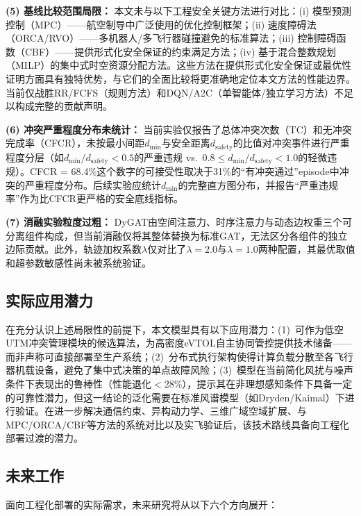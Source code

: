 \documentclass[12pt,a4paper,UTF8]{ctexart}
\begin{document}
\textbf{(5) 基线比较范围局限：} 本文未与以下工程安全关键方法进行对比：(i) 模型预测控制（MPC）——航空制导中广泛使用的优化控制框架；(ii) 速度障碍法（ORCA/RVO）——多机器人/多飞行器碰撞避免的标准算法；(iii) 控制障碍函数（CBF）——提供形式化安全保证的约束满足方法；(iv) 基于混合整数规划（MILP）的集中式时空资源分配方法。这些方法在提供形式化安全保证或最优性证明方面具有独特优势，与它们的全面比较将更准确地定位本文方法的性能边界。当前仅战胜RR/FCFS（规则方法）和DQN/A2C（单智能体/独立学习方法）不足以构成完整的贡献声明。

\textbf{(6) 冲突严重程度分布未统计：} 当前实验仅报告了总体冲突次数（TC）和无冲突完成率（CFCR），未按最小间距$d_{\min}$与安全距离$d_{\text{safety}}$的比值对冲突事件进行严重程度分层（如$d_{\min}/d_{\text{safety}} < 0.5$的严重违规 vs.\ $0.8 \leq d_{\min}/d_{\text{safety}} < 1.0$的轻微违规）。CFCR = 68.4\%这个数字的可接受性取决于31\%的``有冲突通过''episode中冲突的严重程度分布。后续实验应统计$d_{\min}$的完整直方图分布，并报告``严重违规率''作为比CFCR更严格的安全底线指标。

\textbf{(7) 消融实验粒度过粗：} DyGAT由空间注意力、时序注意力与动态边权重三个可分离组件构成，但当前消融仅将其整体替换为标准GAT，无法区分各组件的独立边际贡献。此外，轨迹加权系数$\lambda$仅对比了$\lambda=2.0$与$\lambda=1.0$两种配置，其最优取值和超参数敏感性尚未被系统验证。

\subsection{实际应用潜力}

在充分认识上述局限性的前提下，本文模型具有以下应用潜力：(1)~可作为低空UTM冲突管理模块的候选算法，为高密度eVTOL自主协同管控提供技术储备——而非声称可直接部署至生产系统；(2)~分布式执行架构使得计算负载分散至各飞行器机载设备，避免了集中式决策的单点故障风险；(3)~模型在当前简化风扰与噪声条件下表现出的鲁棒性（性能退化$<$28\%），提示其在非理想感知条件下具备一定的可靠性潜力，但这一结论的泛化需要在标准风谱模型（如Dryden/Kaimal）下进行验证。在进一步解决通信约束、异构动力学、三维广域空域扩展、与MPC/ORCA/CBF等方法的系统对比以及实飞验证后，该技术路线具备向工程化部署过渡的潜力。

\subsection{未来工作}

面向工程化部署的实际需求，未来研究将从以下六个方向展开：
\end{document}
